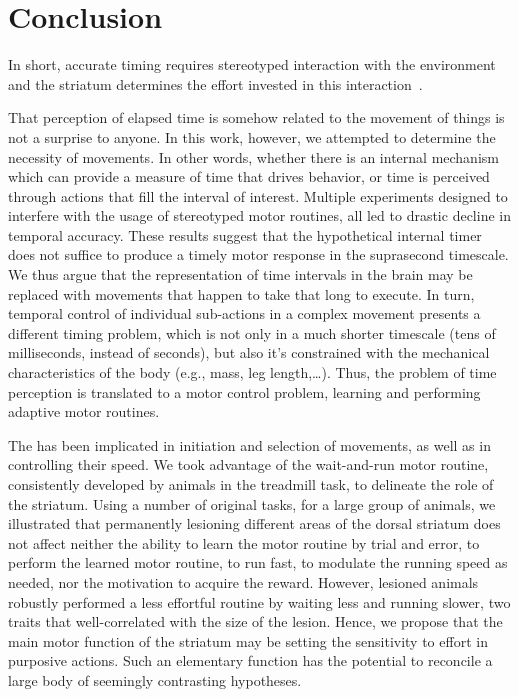 \section{Conclusion} \label{ch:discussion:conclusion}

In short, accurate timing requires stereotyped interaction with the environment and the striatum determines the effort invested in this interaction~\cite{Safaie2020PNAS,JuradoParras2020}.
\par
That perception of elapsed time is somehow related to the movement of things is not a surprise to anyone.
In this work, however, we attempted to determine the necessity of movements.
In other words, whether there is an internal mechanism which can provide a measure of time that drives behavior, or time is perceived through actions that fill the interval of interest.
Multiple experiments designed to interfere with the usage of stereotyped motor routines, all led to drastic decline in temporal accuracy.
These results suggest that the hypothetical internal timer does not suffice to produce a timely motor response in the suprasecond timescale.
We thus argue that the representation of time intervals in the brain may be replaced with movements that happen to take that long to execute.
In turn, temporal control of individual sub-actions in a complex movement presents a different timing problem, which is not only in a much shorter timescale (tens of milliseconds, instead of seconds), but also it's constrained with the mechanical characteristics of the body (e.g., mass, leg length,\dots).
Thus, the problem of time perception is translated to a motor control problem, learning and performing adaptive motor routines.
\par
The  has been implicated in initiation and selection of movements, as well as in controlling their speed.
We took advantage of the wait-and-run motor routine, consistently developed by animals in the treadmill task, to delineate the role of the striatum.
Using a number of original tasks, for a large group of animals, we illustrated that permanently lesioning different areas of the dorsal striatum does not affect neither the ability to learn the motor routine by trial and error, to perform the learned motor routine, to run fast, to modulate the running speed as needed, nor the motivation to acquire the reward.
However, lesioned animals robustly performed a less effortful routine by waiting less and running slower, two traits that well-correlated with the size of the lesion.
Hence, we propose that the main motor function of the striatum may be setting the sensitivity to effort in purposive actions.
Such an elementary function has the potential to reconcile a large body of seemingly contrasting hypotheses.